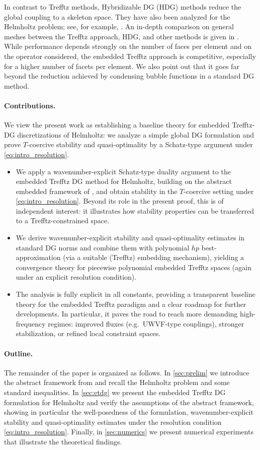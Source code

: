 \documentclass[11pt]{article}
\theoremstyle{definition}
\theoremstyle{plain}
\begin{document}
In contrast to Trefftz methods, Hybridizable DG (HDG) methods reduce the global coupling to a skeleton space.
They have also been analyzed for the Helmholtz problem; see, for example, \cite{CGL09,GM11,CLX13}.
An in-depth comparison on general meshes between the Trefftz approach, HDG, and other methods is given in \cite{LSZ_PAMM_2024}.
While performance depends strongly on the number of faces per element and on the operator considered, the embedded Trefftz approach is competitive, especially for a higher number of facets per element.
We also point out that it goes far beyond the reduction achieved by condensing bubble functions in a standard DG method.

\paragraph{Contributions.}
We view the present work as establishing a baseline theory for embedded Trefftz-DG discretizations of Helmholtz: we analyze a simple global DG formulation and prove $T$-coercive stability and quasi-optimality by a Schatz-type argument under \eqref{eq:intro_resolution}.
\begin{itemize}
\item We apply a wavenumber-explicit Schatz-type duality argument to the embedded Trefftz DG method for Helmholtz, building on the abstract embedded framework of \cite{LLSV_ARXIV_2024}, and obtain stability in the $T$-coercive setting under \eqref{eq:intro_resolution}. Beyond its role in the present proof, this is of independent interest: it illustrates how stability properties can be transferred to a Trefftz-constrained space.
\item We derive wavenumber-explicit stability and quasi-optimality estimates in standard DG norms and combine them with polynomial $hp$ best-approximation (via a suitable (Trefftz) embedding mechanism), yielding a convergence theory for piecewise polynomial embedded Trefftz spaces (again under an explicit resolution condition).
\item The analysis is fully explicit in all constants, providing a transparent baseline theory for the embedded Trefftz paradigm and a clear roadmap for further developments. In particular, it paves the road to reach more demanding high-frequency regimes: improved fluxes (e.g.\ UWVF-type couplings), stronger stabilization, or refined local constraint spaces.
\end{itemize}

\paragraph{Outline.}
The remainder of the paper is organized as follows.
In \cref{sec:prelim} we introduce the abstract framework from \cite{LLSV_ARXIV_2024} and recall the Helmholtz problem and some standard inequalities.
In \cref{sec:etdg} we present the embedded Trefftz DG formulation for Helmholtz and verify the assumptions of the abstract framework, showing in particular the well-posedness of the formulation, wavenumber-explicit stability and quasi-optimality estimates under the resolution condition \eqref{eq:intro_resolution}.
Finally, in \cref{sec:numerics} we present numerical experiments that illustrate the theoretical findings.
\end{document}
